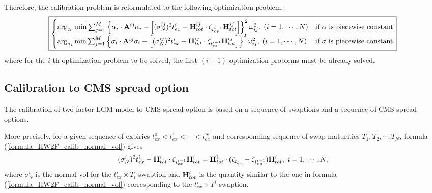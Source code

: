 \documentclass[10pt]{article}
\theoremstyle{plain}
\numberwithin{equation}{section}
\numberwithin{table}{section}
\begin{document}
Therefore, the calibration problem is reformulated to the following
optimization problem:
\begin{eqnarray}\label{formula_HW2F_calib_optimization}
\boxed{
\begin{cases}
\arg_{\alpha_i}\min \sum_{j=1}^M \left\{\alpha_i\cdot {\bf
A}^{ij}\alpha_i -\left[(\sigma_N^{ij})^2 t_{ex}^i- {\bf H}^{ij}_{tot}
\cdot \zeta_{t^{i-1}_{ex}} {\bf
H}^{ij}_{tot}\right]\right\}^2\omega^2_{ij}, \; (i=1,\cdots,N) &
\mbox{if $\alpha$ is piecewise constant} \\
\arg_{\sigma_i}\min \sum_{j=1}^M \left\{\sigma_i\cdot {\bf
A}^{ij}\sigma_i -\left[(\sigma_N^{ij})^2 t_{ex}^i- {\bf H}^{ij}_{tot}
\cdot \zeta_{t^{i-1}_{ex}} {\bf
H}^{ij}_{tot}\right]\right\}^2\omega^2_{ij}, \; (i=1,\cdots,N) &
\mbox{if $\sigma$ is piecewise constant}
\end{cases}
}
\end{eqnarray}
where for the $i$-th optimization problem to be solved, the first
$(i-1)$ optimization problems must be already solved.

\subsection{Calibration to CMS spread option}

The calibration of two-factor LGM model to CMS spread option is based
on a sequence of swaptions  and a sequence of CMS spread options.

More precisely, for a given sequence of expiries $t_{ex}^0 < t_{ex}^1
< \cdots < t_{ex}^N$ and corresponding sequence of swap maturities
$T_1, T_2, \cdots, T_N$, formula (\ref{formula_HW2F_calib_normal_vol})
gives
\[
(\sigma_N^i)^2 t_{ex}^i - {\bf H}_{tot}^i \cdot \zeta_{t_{ex}^{i-1}}
{\bf H}_{tot}^i = {\bf H}_{tot}^i \cdot (\zeta_{t_{ex}^{i}} -
\zeta_{t_{ex}^{i-1}}) {\bf H}_{tot}^i, \; i=1,\cdots, N,
\]
where $\sigma_N^i$ is the normal vol for the $t^i_{ex} \times T_i$
swaption and ${\bf H}_{tot}^i$ is the quantity similar to the one in
formula (\ref{formula_HW2F_calib_normal_vol}) corresponding to the
$t_{ex}^i \times T^i$ swaption.
\end{document}
